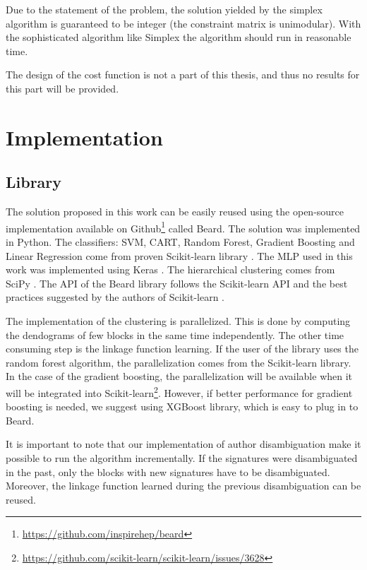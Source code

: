 \documentclass{pracamgr}
\begin{document}
Due to the statement of the problem, the solution yielded by the simplex algorithm is
guaranteed to be integer (the constraint matrix is unimodular). With the sophisticated
algorithm like Simplex \citep{simplex} the algorithm should run in reasonable time.

The design of the cost function is not a part of this thesis, and thus no results for this
part will be provided.


\part{Implementation}

\chapter{Library}

The solution proposed in this work can be easily reused using the open-source
implementation available on
Github\footnote{\href{https://github.com/inspirehep/beard}{https://github.com/inspirehep/beard}}
called Beard.
The solution was implemented in Python. The classifiers: SVM, CART, Random Forest,
Gradient Boosting and Linear Regression come from proven Scikit-learn library
\citep{scikitlearn}. The MLP used in this work was implemented using Keras
\citep{chollet2015}. The hierarchical
clustering comes from SciPy \citep{scipy}. The API of the Beard library follows
the Scikit-learn API and the best practices suggested by the authors of
Scikit-learn \citep{scikitlearnAPI}.

The implementation of the clustering is parallelized. This is done by computing
the dendograms of few blocks in the same time independently. The other time consuming
step is the linkage function learning. If the user of the library uses the random forest
algorithm, the parallelization comes from the Scikit-learn library. In the case
of the gradient boosting, the parallelization will be available when it will be
integrated into Scikit-learn\footnote{\href{https://github.com/scikit-learn/scikit-learn/issues/3628}{https://github.com/scikit-learn/scikit-learn/issues/3628}}. However,
if better performance for gradient boosting is needed, we suggest using XGBoost library,
which is easy to plug in to Beard.

It is important to note that our implementation of author disambiguation make it possible
to run the algorithm incrementally. If the signatures were disambiguated in the past,
only the blocks with new signatures have to be disambiguated. Moreover, the linkage function
learned during the previous disambiguation can be reused.
\end{document}
